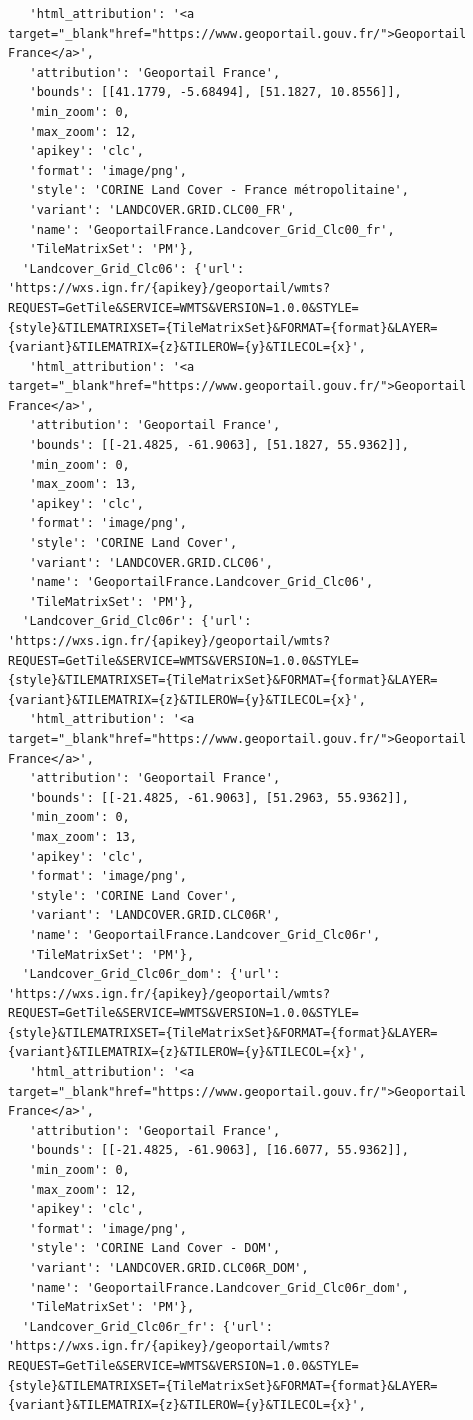 \documentclass[
  letterpaper,
  DIV=11,
  numbers=noendperiod]{scrreprt}
\begin{document}
\begin{verbatim}
   'html_attribution': '<a target="_blank"href="https://www.geoportail.gouv.fr/">Geoportail France</a>',
   'attribution': 'Geoportail France',
   'bounds': [[41.1779, -5.68494], [51.1827, 10.8556]],
   'min_zoom': 0,
   'max_zoom': 12,
   'apikey': 'clc',
   'format': 'image/png',
   'style': 'CORINE Land Cover - France métropolitaine',
   'variant': 'LANDCOVER.GRID.CLC00_FR',
   'name': 'GeoportailFrance.Landcover_Grid_Clc00_fr',
   'TileMatrixSet': 'PM'},
  'Landcover_Grid_Clc06': {'url': 'https://wxs.ign.fr/{apikey}/geoportail/wmts?REQUEST=GetTile&SERVICE=WMTS&VERSION=1.0.0&STYLE={style}&TILEMATRIXSET={TileMatrixSet}&FORMAT={format}&LAYER={variant}&TILEMATRIX={z}&TILEROW={y}&TILECOL={x}',
   'html_attribution': '<a target="_blank"href="https://www.geoportail.gouv.fr/">Geoportail France</a>',
   'attribution': 'Geoportail France',
   'bounds': [[-21.4825, -61.9063], [51.1827, 55.9362]],
   'min_zoom': 0,
   'max_zoom': 13,
   'apikey': 'clc',
   'format': 'image/png',
   'style': 'CORINE Land Cover',
   'variant': 'LANDCOVER.GRID.CLC06',
   'name': 'GeoportailFrance.Landcover_Grid_Clc06',
   'TileMatrixSet': 'PM'},
  'Landcover_Grid_Clc06r': {'url': 'https://wxs.ign.fr/{apikey}/geoportail/wmts?REQUEST=GetTile&SERVICE=WMTS&VERSION=1.0.0&STYLE={style}&TILEMATRIXSET={TileMatrixSet}&FORMAT={format}&LAYER={variant}&TILEMATRIX={z}&TILEROW={y}&TILECOL={x}',
   'html_attribution': '<a target="_blank"href="https://www.geoportail.gouv.fr/">Geoportail France</a>',
   'attribution': 'Geoportail France',
   'bounds': [[-21.4825, -61.9063], [51.2963, 55.9362]],
   'min_zoom': 0,
   'max_zoom': 13,
   'apikey': 'clc',
   'format': 'image/png',
   'style': 'CORINE Land Cover',
   'variant': 'LANDCOVER.GRID.CLC06R',
   'name': 'GeoportailFrance.Landcover_Grid_Clc06r',
   'TileMatrixSet': 'PM'},
  'Landcover_Grid_Clc06r_dom': {'url': 'https://wxs.ign.fr/{apikey}/geoportail/wmts?REQUEST=GetTile&SERVICE=WMTS&VERSION=1.0.0&STYLE={style}&TILEMATRIXSET={TileMatrixSet}&FORMAT={format}&LAYER={variant}&TILEMATRIX={z}&TILEROW={y}&TILECOL={x}',
   'html_attribution': '<a target="_blank"href="https://www.geoportail.gouv.fr/">Geoportail France</a>',
   'attribution': 'Geoportail France',
   'bounds': [[-21.4825, -61.9063], [16.6077, 55.9362]],
   'min_zoom': 0,
   'max_zoom': 12,
   'apikey': 'clc',
   'format': 'image/png',
   'style': 'CORINE Land Cover - DOM',
   'variant': 'LANDCOVER.GRID.CLC06R_DOM',
   'name': 'GeoportailFrance.Landcover_Grid_Clc06r_dom',
   'TileMatrixSet': 'PM'},
  'Landcover_Grid_Clc06r_fr': {'url': 'https://wxs.ign.fr/{apikey}/geoportail/wmts?REQUEST=GetTile&SERVICE=WMTS&VERSION=1.0.0&STYLE={style}&TILEMATRIXSET={TileMatrixSet}&FORMAT={format}&LAYER={variant}&TILEMATRIX={z}&TILEROW={y}&TILECOL={x}',

\end{verbatim}
\end{document}
